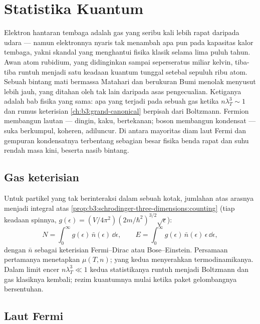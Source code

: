 \chapter{Statistika Kuantum}\label{ch:b3:quantum-statistics}

Elektron hantaran tembaga adalah gas yang seribu kali lebih rapat
daripada udara --- namun elektronnya nyaris tak menambah apa pun pada
kapasitas kalor tembaga, yakni skandal yang menghantui fisika klasik
selama lima puluh tahun. Awan atom rubidium, yang didinginkan sampai
seperseratus miliar kelvin, tiba-tiba runtuh menjadi satu keadaan
kuantum tunggal setebal sepuluh ribu atom. Sebuah bintang mati bermassa
Matahari dan berukuran Bumi menolak menyusut lebih jauh, yang ditahan
oleh tak lain daripada asas pengecualian. Ketiganya adalah bab fisika
yang sama: apa yang terjadi pada sebuah gas ketika $n\lambda_T^3 \sim 1$
dan rumus keterisian \cref{ch:b3:grand-canonical} berpisah dari
Boltzmann. Fermion membangun lautan --- dingin, kaku, bertekanan; boson
membangun kondensat --- suka berkumpul, koheren, adiluncur. Di antara
mayoritas diam laut Fermi dan gempuran kondensatnya terbentang sebagian
besar fisika benda rapat dan suhu rendah masa kini, beserta nasib
bintang.

\section{Gas keterisian}

\begin{proposition}\label{prop:b3:quantum-statistics:machinery}
Untuk partikel yang tak berinteraksi dalam sebuah kotak, jumlahan atas
arasnya menjadi integral atas 
\cref{prop:b3:schrodinger-three-dimensions:counting} (tiap keadaan
spinnya, $g(\epsilon) = (V/4\pi^2)(2m/\hbar^2)^{3/2}\sqrt\epsilon$):
\[
N = \int_0^\infty g(\epsilon)\,\bar n(\epsilon)\,\dd\epsilon ,
\qquad
E = \int_0^\infty g(\epsilon)\,\bar n(\epsilon)\,\epsilon\,
\dd\epsilon ,
\]
dengan $\bar n$ sebagai keterisian Fermi--Dirac atau Bose--Einstein.
Persamaan pertamanya menetapkan $\mu(T, n)$; yang kedua menyerahkan
termodinamikanya. Dalam limit encer $n\lambda_T^3 \ll 1$ kedua
statistikanya runtuh menjadi Boltzmann dan gas klasiknya kembali;
rezim kuantumnya mulai ketika paket gelombangnya bersentuhan.
\end{proposition}
\admitted

\section{Laut Fermi}

